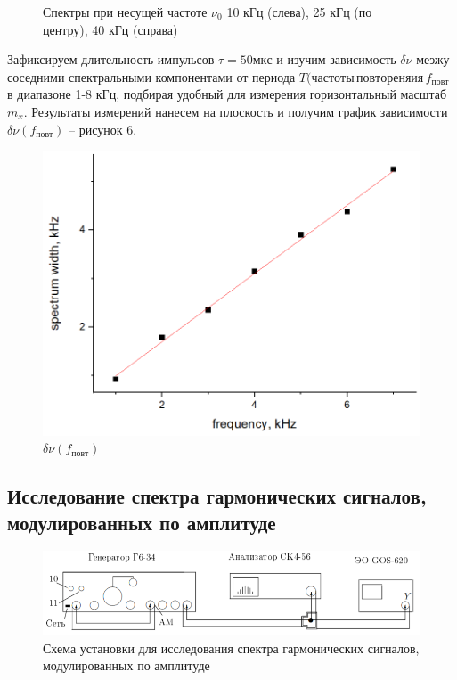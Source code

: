 \documentclass[a4paper, fontsize = 14pt]{article}
\begin{document}
\begin{figure}[hbt]
\begin{tabular}{cc}
\end{tabular}
\caption{Спектры при несущей частоте $\nu_0$ 10 кГц (слева), 25 кГц (по центру), 40 кГц (справа)}
\end{figure}

Зафиксируем длительность импульсов $\tau = 50 мкс$ и изучим зависимость $\delta \nu$ меэжу соседними спектральными компонентами от периода $T ( частоты \, повтореняия \, f_{повт}$ в диапазоне 1-8 кГц, подбирая удобный для измерения горизонтальный масштаб $m_x$. Результаты измерений нанесем на плоскость и получим график зависимости $\delta \nu (f_{повт})$ -- рисунок 6.

\begin{figure}[hbt]
	\centering
	\includegraphics[scale=0.4]{lab361ris9.png}
	\caption{$\delta \nu (f_{повт})$}
\end{figure} 

\newpage

\subsection*{Исследование спектра гармонических сигналов, модулированных по амплитуде}

\begin{figure}[hbt]
	\centering
	\includegraphics[scale=0.8]{lab361ris10.png}
	\caption{Схема установки для исследования спектра гармонических сигналов, модулированных по амплитуде}
\end{figure}
\end{document}
